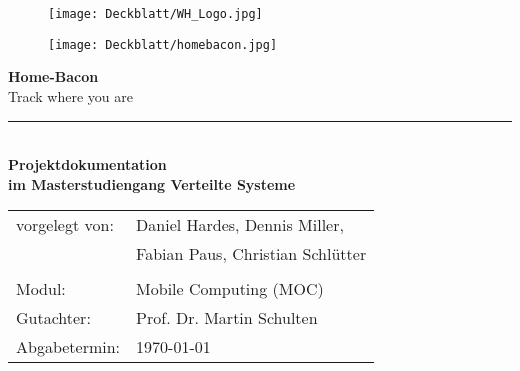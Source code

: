 \thispagestyle{plain}
\begin{titlepage}

\begin{center}
\centering
\begin{figure}
\begin{minipage}{0.65\textwidth}
\texttt{[image: Deckblatt/WH\_Logo.jpg]}
\end{minipage}
\qquad
\begin{minipage}{0.25\textwidth}
\texttt{[image: Deckblatt/homebacon.jpg]}
\end{minipage}
\end{figure}

\vspace*{2cm}

\Huge{\textbf{Home-Bacon}}\\
\Large{Track where you are}\\
\rule{\textwidth}{0.4pt}\\[3.0ex]

\Large{\textbf{Projektdokumentation}}\\[1.5ex]
\large{\textbf{im Masterstudiengang Verteilte Systeme}}\\[3.0ex]

\normalsize
\begin{tabular}{ll}\\
	vorgelegt von: 
	& \quad Daniel Hardes,  Dennis Miller, \\[1.2ex]
	& \quad Fabian Paus, Christian Schlütter\\[1.2ex]
	& \quad \\[1.2ex]
	Modul:  & \quad Mobile Computing (MOC) \\[1.2ex]
	Gutachter:  & \quad Prof. Dr. Martin Schulten \\[1.2ex]
	Abgabetermin:  & \quad \today\\[1.2ex]
\end{tabular}

\end{center}

\end{titlepage}

